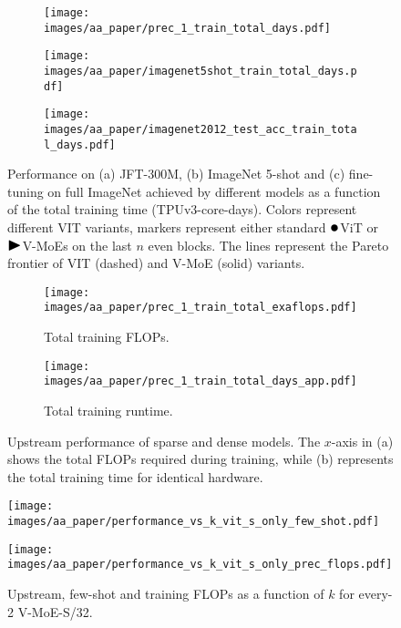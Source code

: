 \documentclass{article}
\newcommand{\densesym}{{\protect\scalebox{1.4}{$\bullet$}}}
\newcommand{\lastsym}{{\protect\scalebox{1.4}{$\blacktriangleright$}}}
\newcommand{\abbv}{{V-MoE}}
\begin{document}
\begin{figure}
\centering
\begin{subfigure}{.3\textwidth}
  \centering
  \texttt{[image: images/aa\_paper/prec\_1\_train\_total\_days.pdf]}
  \caption{}
  \label{im:upstream_vs_days}
\end{subfigure}\begin{subfigure}{.3\textwidth}
  \centering
  \texttt{[image: images/aa\_paper/imagenet5shot\_train\_total\_days.pdf]}
  \caption{}
  \label{im:imagenet5shot_vs_days}
\end{subfigure}
\begin{subfigure}{.3\textwidth}
  \centering
  \texttt{[image: images/aa\_paper/imagenet2012\_test\_acc\_train\_total\_days.pdf]}
  \caption{}
  \label{im:imagenet_finetune_vs_days}
\end{subfigure}
\caption{Performance on (a) JFT-300M, (b) ImageNet 5-shot and (c) fine-tuning on full ImageNet achieved by different models as a function of the total training time (TPUv3-core-days).
Colors represent different VIT variants, markers represent either standard $\densesym{}$ViT or $\lastsym{}$V-MoEs on the last $n$ even blocks.
The lines represent the Pareto frontier of VIT (dashed) and V-MoE (solid) variants.}
\label{im:performance_vs_days}
\end{figure}




\begin{figure}
\centering
\begin{subfigure}{.50\textwidth}
  \centering
  \texttt{[image: images/aa\_paper/prec\_1\_train\_total\_exaflops.pdf]}
  \caption{Total training FLOPs.}
  \label{im:upstream_vs_model_flops}
\end{subfigure}\begin{subfigure}{.50\textwidth}
  \centering
  \texttt{[image: images/aa\_paper/prec\_1\_train\_total\_days\_app.pdf]}
  \caption{Total training runtime.}
  \label{im:upstream_vs_model_runtime_app}
\end{subfigure}
\caption{Upstream performance of sparse and dense models.
The $x$-axis in (a) shows the total FLOPs required during training, while (b) represents the total training time for identical hardware. 
}
\label{im:upstream_vs_model}
\end{figure}


\begin{figure}[tb]
\centering
\texttt{[image: images/aa\_paper/performance\_vs\_k\_vit\_s\_only\_few\_shot.pdf]}
\caption{Upstream, few-shot and training FLOPs as a function of $k$ for every-2 \abbv{}-S/32.}
\texttt{[image: images/aa\_paper/performance\_vs\_k\_vit\_s\_only\_prec\_flops.pdf]}
\label{im:performance_increasing_k}
\end{figure}
\end{document}
